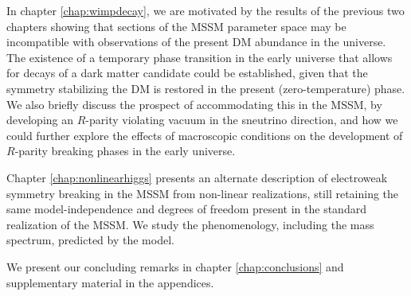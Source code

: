 In chapter \ref{chap:wimpdecay}, we are motivated by the results of the previous two chapters showing that sections of the MSSM parameter space may be incompatible with observations of the present DM abundance in the universe. The existence of a temporary phase transition in the early universe that allows for decays of a dark matter candidate could be established, given that the symmetry stabilizing the DM is restored in the present (zero-temperature) phase. We also briefly discuss the prospect of accommodating this in the MSSM, by developing an $R$-parity violating vacuum in the sneutrino direction, and how we could further explore the effects of macroscopic conditions on the development of $R$-parity breaking phases in the early universe.

Chapter \ref{chap:nonlinearhiggs} presents an alternate description of electroweak symmetry breaking in the MSSM from non-linear realizations, still retaining the same model-independence and degrees of freedom present in the standard realization of the MSSM. We study the phenomenology, including the mass spectrum, predicted by the model.

We present our concluding remarks in chapter \ref{chap:conclusions} and supplementary material in the appendices.

